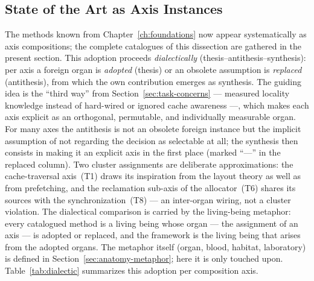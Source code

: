 \begin{nurlang}
\section{State of the Art as Axis Instances}\label{sec:sota-instances}
The methods known from Chapter~\ref{ch:foundations} now appear systematically as axis compositions;
the complete catalogues of this dissection are gathered in the present section.
This adoption proceeds \emph{dialectically} (thesis--antithesis--synthesis): per axis a foreign organ is
\emph{adopted} (thesis) or an obsolete assumption is \emph{replaced} (antithesis), from which the own
contribution emerges as synthesis. The guiding idea is the \enquote{third way} from
Section~\ref{sec:task-concerns} --- measured locality knowledge instead of hard-wired or ignored cache
awareness ---, which makes each axis explicit as an orthogonal, permutable, and individually measurable
organ. For many axes the antithesis is not an obsolete foreign instance but the implicit assumption of not
regarding the decision as selectable at all; the synthesis then consists in making it an explicit axis in
the first place (marked \enquote{---} in the replaced column). Two cluster assignments are deliberate
approximations: the cache-traversal axis~(T1) draws its inspiration from the layout theory as well as
from prefetching, and the reclamation sub-axis of the allocator~(T6) shares its sources with the
synchronization~(T8) --- an inter-organ wiring, not a cluster violation. The dialectical comparison is
carried by the living-being metaphor: every catalogued method is a living being whose organ --- the
assignment of an axis --- is adopted or replaced, and the framework is the living being that arises from
the adopted organs. The metaphor itself (organ, blood, habitat, laboratory) is defined in
Section~\ref{sec:anatomy-metaphor}; here it is only touched upon.
Table~\ref{tab:dialectic} summarizes this adoption per composition axis.
\end{nurlang}
